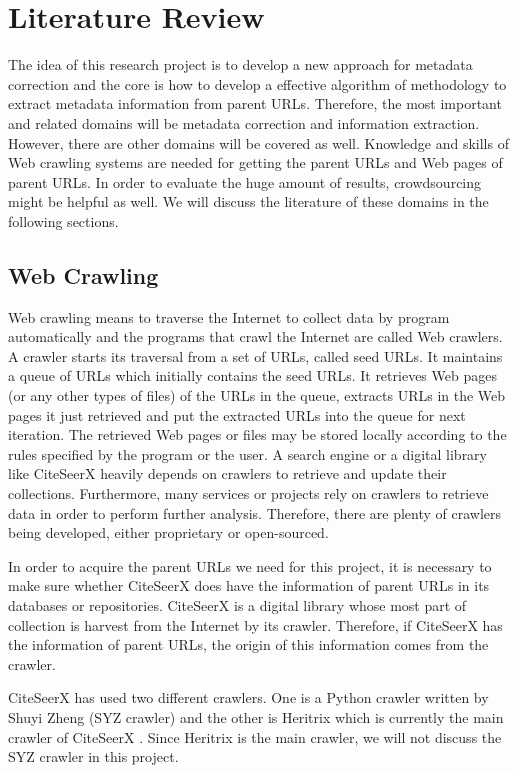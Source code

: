 \documentclass[prodmode]{acmsmall} %
\begin{document}
\section{Literature Review}
The idea of this research project is to develop a new approach for metadata correction and the core is how to develop a effective algorithm of methodology to extract metadata information from parent URLs. Therefore, the most important and related domains will be metadata correction and information extraction. However, there are other domains will be covered as well. Knowledge and skills of Web crawling systems are needed for getting the parent URLs and Web pages of parent URLs. In order to evaluate the huge amount of results, crowdsourcing might be helpful as well. We will discuss the literature of these domains in the following sections. 

\subsection{Web Crawling}
Web crawling means to traverse the Internet to collect data by program automatically and the programs that crawl the Internet are called Web crawlers. A crawler starts its traversal from a set of URLs, called seed URLs. It maintains a queue of URLs which initially contains the seed URLs. It retrieves Web pages (or any other types of files) of the URLs in the queue, extracts URLs in the Web pages it just retrieved and put the extracted URLs into the queue for next iteration. The retrieved Web pages or files may be stored locally according to the rules specified by the program or the user. A search engine or a digital library like CiteSeerX heavily depends on crawlers to retrieve and update their collections. Furthermore, many services or projects rely on crawlers to retrieve data in order to perform further analysis. Therefore, there are plenty of crawlers being developed, either proprietary or open-sourced.

In order to acquire the parent URLs we need for this project, it is necessary to make sure whether CiteSeerX does have the information of parent URLs in its databases or repositories. CiteSeerX is a digital library whose most part of collection is harvest from the Internet by its crawler. Therefore, if CiteSeerX has the information of parent URLs, the origin of this information comes from the crawler.

CiteSeerX has used two different crawlers. One is a Python crawler written by Shuyi Zheng (SYZ crawler) and the other is Heritrix which is currently the main crawler of CiteSeerX \cite{Wu2012}. Since Heritrix is the main crawler, we will not discuss the SYZ crawler in this project.
\end{document}
